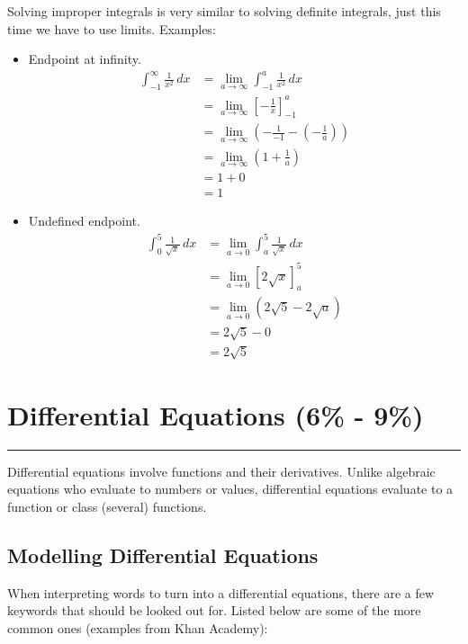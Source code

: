 \documentclass[12pt]{article}
\newcommand{\fline}{\par\noindent\rule{\textwidth}{0.1pt}} %
\begin{document}
            Solving improper integrals is very similar to solving definite integrals, just this time we have to use limits. Examples:
            \begin{itemize}
                \item Endpoint at infinity.
                \begin{align*}
                    \int_{-1}^{\infty} \frac{1}{x^2} \, dx &= \lim_{a \to \infty} \int_{-1}^{a} \frac{1}{x^2} \, dx \\[6pt]
                    &= \lim_{a \to \infty} \left[ -\frac{1}{x} \right]_{-1}^{a} \\[6pt]
                    &= \lim_{a \to \infty} \left( -\frac{1}{-1} - \left( -\frac{1}{a} \right) \right) \\[6pt]
                    &= \lim_{a \to \infty} \left( 1 + \frac{1}{a} \right) \\[6pt]
                    &= 1+0 \\
                    &= 1
                \end{align*}

                \item Undefined endpoint.
                \begin{align*}
                    \int_{0}^{5} \frac{1}{\sqrt{x}} \, dx &= \lim_{a \to 0} \int_{a}^{5} \frac{1}{\sqrt{x}} \, dx \\[6pt]
                    &= \lim_{a \to 0} \left[ 2\sqrt{x} \right]_{a}^{5} \\
                    &= \lim_{a \to 0} \left( 2\sqrt{5} - 2\sqrt{a} \right) \\
                    &= 2\sqrt{5} - 0 \\
                    &= 2\sqrt{5}
                \end{align*}
            \end{itemize}

    \section{Differential Equations (6\% - 9\%)}
    \fline

        Differential equations involve functions and their derivatives. Unlike algebraic equations who evaluate to numbers or values, differential equations evaluate to a function or class (several) functions.

        \subsection{Modelling Differential Equations}
            When interpreting words to turn into a differential equations, there are a few keywords that should be looked out for. Listed below are some of the more common ones (examples from Khan Academy):
\end{document}

